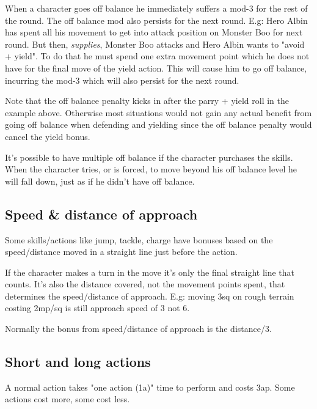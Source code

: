 When a character goes off balance he immediately suffers a mod-3 for the rest of the round. The off balance mod also persists for the next round. E.g: Hero Albin has spent all his movement to get into attack position on Monster Boo for next round. But then, \emph{supplies}, Monster Boo attacks and Hero Albin wants to "avoid + yield". To do that he must spend one extra movement point which he does not have for the final move of the yield action. This will cause him to go off balance, incurring the mod-3 which will also persist for the next round.

Note that the off balance penalty kicks in after the parry + yield roll in the example above. Otherwise most situations would not gain any actual benefit from going off balance when defending and yielding since the off balance penalty would cancel the yield bonus.

It's possible to have multiple off balance if the character purchases the skills.
When the character tries, or is forced, to move beyond his off balance level he will fall down, just as if he didn't have off balance.


\subsection*{Speed \& distance of approach}
\label{sec:approach}
Some skills/actions like jump, tackle, charge have bonuses based on the speed/distance moved in a straight line just before the action.

If the character makes a turn in the move it's only the final straight line that counts. It's also the distance covered, not the movement points spent, that determines the speed/distance of approach. E.g: moving 3sq on rough terrain costing 2mp/sq is still approach speed of 3 not 6.

Normally the bonus from speed/distance of approach is the distance/3.















\subsection*{Short and long actions}
A normal action takes "one action (1a)" time to perform and costs 3ap. Some actions cost more, some cost less.

